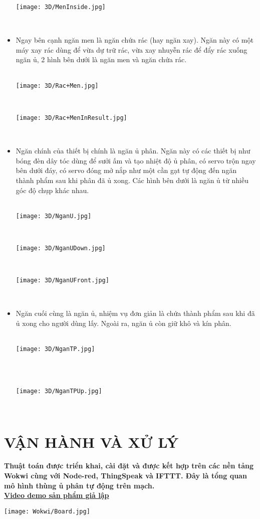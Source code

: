 \documentclass[12pt, a4paper]{article}
\begin{document}
\begin{itemize}
    \centerline{\texttt{[image: 3D/MenInside.jpg]}} \\ 
    \item Ngay bên cạnh ngăn men là ngăn chứa rác (hay ngăn xay). Ngăn này có một máy xay rác dùng để vừa dự trữ rác, vừa xay nhuyễn rác để đẩy rác xuống ngăn ủ, 2 hình bên dưới là ngăn men và ngăn chứa rác. \\ \\
    \centerline{\texttt{[image: 3D/Rac+Men.jpg]}} \\ 
    \centerline{\texttt{[image: 3D/Rac+MenInResult.jpg]}} \\ 
    \item Ngăn chính của thiết bị chính là ngăn ủ phân. Ngăn này có các thiết bị như bóng đèn dây tóc dùng để sưởi ấm và tạo nhiệt độ ủ phân, có servo trộn ngay bên dưới đáy, có servo đóng mở nắp như một cần gạt tự động đến ngăn thành phẩm sau khi phân đã ủ xong. Các hình bên dưới là ngăn ủ từ nhiều góc độ chụp khác nhau.\\ \\
    \centerline{\texttt{[image: 3D/NganU.jpg]}} \\ 
    \centerline{\texttt{[image: 3D/NganUDown.jpg]}} \\
    \centerline{\texttt{[image: 3D/NganUFront.jpg]}} \\ 
    \item Ngăn cuối cùng là ngăn ủ, nhiệm vụ đơn giản là chứa thành phẩm sau khi đã ủ xong cho người dùng lấy. Ngoài ra,   ngăn ủ còn giữ khô và kín phân. \\ \\
    \centerline{\texttt{[image: 3D/NganTP.jpg]}} \\ \\
    \centerline{\texttt{[image: 3D/NganTPUp.jpg]}} \\
\end{itemize}
\section{VẬN HÀNH VÀ XỬ LÝ}

\textbf{Thuật toán được triển khai, cài đặt và được kết hợp trên các nền tảng Wokwi cùng với Node-red, ThingSpeak và IFTTT. Đây là tổng quan mô hình thùng ủ phân tự động trên mạch.} \\
\textbf{\href{https://drive.google.com/drive/folders/1SFOhzDiOCOt-AMFM7m-FWzQ3i351csu7?usp=sharing}{Video demo sản phẩm giả lập}} \\
\centerline{\texttt{[image: Wokwi/Board.jpg]}} \\
\end{document}
